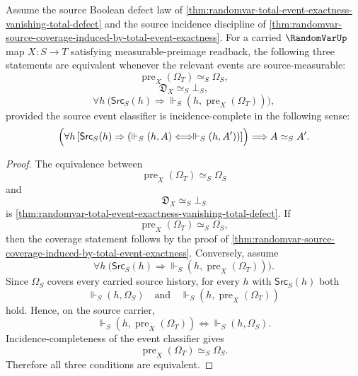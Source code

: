\begin{corollary}
\label{cor:randomvar-terminal-preimage-exactness-unique-no-loss-boundary}
Assume the source Boolean defect law of \autoref{thm:randomvar-total-event-exactness-vanishing-total-defect} and the source incidence discipline of \autoref{thm:randomvar-source-coverage-induced-by-total-event-exactness}. For a carried $\RandomVarUp$ map $X:S\to T$ satisfying measurable-preimage readback, the following three statements are equivalent whenever the relevant events are source-measurable:
$$
\operatorname{pre}_X(\Omega_T)\simeq_S\Omega_S,
$$
$$
\mathfrak D_X\simeq_S\bot_S,
$$
$$
\forall h\ \bigl(\mathsf{Src}_S(h)\Longrightarrow \Vdash_S(h,\operatorname{pre}_X(\Omega_T))\bigr),
$$
provided the source event classifier is incidence-complete in the following sense:
$$
\Bigl(\forall h\,[\mathsf{Src}_S(h)\Rightarrow(\Vdash_S(h,A)\Longleftrightarrow \Vdash_S(h,A'))]\Bigr)
\Longrightarrow
A\simeq_S A'.
$$
\end{corollary}
\begin{proof}
The equivalence between
$$
\operatorname{pre}_X(\Omega_T)\simeq_S\Omega_S
$$
and
$$
\mathfrak D_X\simeq_S\bot_S
$$
is \autoref{thm:randomvar-total-event-exactness-vanishing-total-defect}.
If
$$
\operatorname{pre}_X(\Omega_T)\simeq_S\Omega_S,
$$
then the coverage statement follows by the proof of \autoref{thm:randomvar-source-coverage-induced-by-total-event-exactness}.
Conversely, assume
$$
\forall h\ \bigl(\mathsf{Src}_S(h)\Rightarrow \Vdash_S(h,\operatorname{pre}_X(\Omega_T))\bigr).
$$
Since $\Omega_S$ covers every carried source history, for every $h$ with $\mathsf{Src}_S(h)$ both
$$
\Vdash_S(h,\Omega_S)
\quad\text{and}\quad
\Vdash_S(h,\operatorname{pre}_X(\Omega_T))
$$
hold. Hence, on the source carrier,
$$
\Vdash_S(h,\operatorname{pre}_X(\Omega_T))
\Longleftrightarrow
\Vdash_S(h,\Omega_S).
$$
Incidence-completeness of the event classifier gives
$$
\operatorname{pre}_X(\Omega_T)\simeq_S\Omega_S.
$$
Therefore all three conditions are equivalent.
\end{proof}

